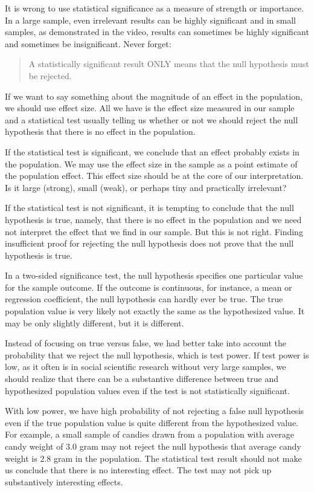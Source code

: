 \documentclass[a4paper]{book}
\theoremstyle{definition}
\theoremstyle{definition}
\theoremstyle{definition}
\theoremstyle{remark}
\begin{document}
It is wrong to use statistical significance as a measure of strength or
importance. In a large sample, even irrelevant results can be highly
significant and in small samples, as demonstrated in the video, results
can sometimes be highly significant and sometimes be insignificant.
Never forget:

\begin{quote}
A statistically significant result ONLY means that the null hypothesis
must be rejected.
\end{quote}

If we want to say something about the magnitude of an effect in the
population, we should use effect size. All we have is the effect size
measured in our sample and a statistical test usually telling us whether
or not we should reject the null hypothesis that there is no effect in
the population.

If the statistical test is significant, we conclude that an effect
probably exists in the population. We may use the effect size in the
sample as a point estimate of the population effect. This effect size
should be at the core of our interpretation. Is it large (strong), small
(weak), or perhaps tiny and practically irrelevant?

If the statistical test is not significant, it is tempting to conclude
that the null hypothesis is true, namely, that there is no effect in the
population and we need not interpret the effect that we find in our
sample. But this is not right. Finding insufficient proof for rejecting
the null hypothesis does not prove that the null hypothesis is true.

In a two-sided significance test, the null hypothesis specifies one
particular value for the sample outcome. If the outcome is continuous,
for instance, a mean or regression coefficient, the null hypothesis can
hardly ever be true. The true population value is very likely not
exactly the same as the hypothesized value. It may be only slightly
different, but it is different.

Instead of focusing on true versus false, we had better take into
account the probability that we reject the null hypothesis, which is
test power. If test power is low, as it often is in social scientific
research without very large samples, we should realize that there can be
a substantive difference between true and hypothesized population values
even if the test is not statistically significant.

With low power, we have high probability of not rejecting a false null
hypothesis even if the true population value is quite different from the
hypothesized value. For example, a small sample of candies drawn from a
population with average candy weight of 3.0 gram may not reject the null
hypothesis that average candy weight is 2.8 gram in the population. The
statistical test result should not make us conclude that there is no
interesting effect. The test may not pick up substantively interesting
effects.
\end{document}
